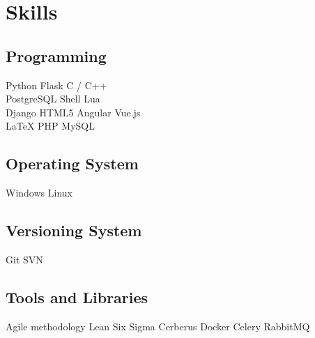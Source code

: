 \documentclass[top=0in]{deedy-resume-openfont}
\begin{document}
%
%
\lastupdated

%
%

%
%

\begin{minipage}[t]{0.33\textwidth} 


\section{Skills}
\subsection{Programming}
Python 
\textbullet{} Flask 
\textbullet{} C / C++
\vspace{\topsep}
\\
PostgreSQL
\textbullet{} Shell 
\textbullet{} Lua
\\Django
\textbullet{} HTML5
\textbullet{} Angular
\textbullet{} Vue.js
\vspace{\topsep}
\\
\LaTeX
\textbullet{} PHP 
\textbullet{} MySQL
\sectionsep

\subsection{Operating System}
Windows 
\textbullet{} Linux 
\sectionsep

\subsection{Versioning System}
Git 
\textbullet{} SVN 
\sectionsep

\subsection{Tools and Libraries}
Agile methodology
\textbullet{} Lean Six Sigma
\textbullet{} Cerberus
\textbullet{} Docker 
\textbullet{} Celery
\textbullet{} RabbitMQ
\sectionsep


\end{minipage}
\end{document}
